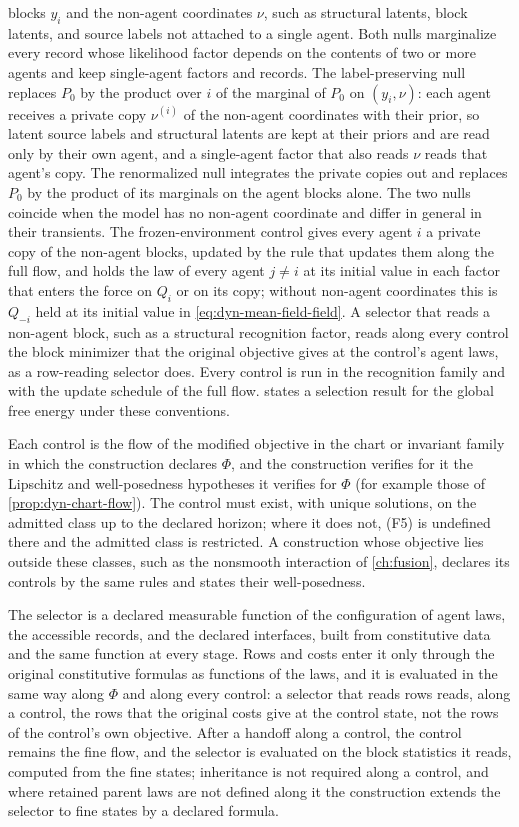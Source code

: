 blocks $y_i$ and the non-agent coordinates $\nu$, such as structural latents,
block latents, and source labels not attached to a single agent. Both nulls
marginalize every record whose likelihood factor depends on the contents of
two or more agents and keep single-agent factors and records. The
label-preserving null replaces $P_0$ by the product over $i$ of the marginal
of $P_0$ on $(y_i,\nu)$: each agent receives a private copy $\nu^{(i)}$ of the
non-agent coordinates with their prior, so latent source labels and
structural latents are kept at their priors and are read only by their own
agent, and a single-agent factor that also reads $\nu$ reads that agent's
copy. The renormalized null integrates the private copies out and replaces
$P_0$ by the product of its marginals on the agent blocks alone. The two
nulls coincide when the model has no non-agent coordinate and differ in
general in their transients. The frozen-environment control gives every
agent $i$ a private copy of the non-agent blocks, updated by the rule that
updates them along the full flow, and holds the law of every agent $j\neq i$
at its initial value in each factor that enters the force on $Q_i$ or on its
copy; without non-agent coordinates this is $Q_{-i}$ held at its initial
value in \cref{eq:dyn-mean-field-field}. A selector that reads a non-agent
block, such as a structural recognition factor, reads along every control the
block minimizer that the original objective gives at the control's agent
laws, as a row-reading selector does. Every control is run in the
recognition family and with the update schedule of the full flow.
 states a selection result for the global free
energy under these conventions.

Each control is the flow of the modified objective in the chart or invariant
family in which the construction declares $\Phi$, and the construction
verifies for it the Lipschitz and well-posedness hypotheses it verifies for
$\Phi$ (for example those of \cref{prop:dyn-chart-flow}). The control must
exist, with unique solutions, on the admitted class up to the declared
horizon; where it does not, (F5) is undefined there and the admitted class is
restricted. A construction whose objective lies outside these classes, such
as the nonsmooth interaction of \cref{ch:fusion}, declares its controls by
the same rules and states their well-posedness.

The selector is a declared measurable function of the configuration of agent
laws, the accessible records, and the declared interfaces, built from
constitutive data and the same function at every stage. Rows and costs enter
it only through the original constitutive formulas as functions of the laws,
and it is evaluated in the same way along $\Phi$ and along every control: a
selector that reads rows reads, along a control, the rows that the original
costs give at the control state, not the rows of the control's own
objective. After a handoff along a control, the control remains the fine
flow, and the selector is evaluated on the block statistics it reads,
computed from the fine states; inheritance is not required along a control,
and where retained parent laws are not defined along it the construction
extends the selector to fine states by a declared formula.

